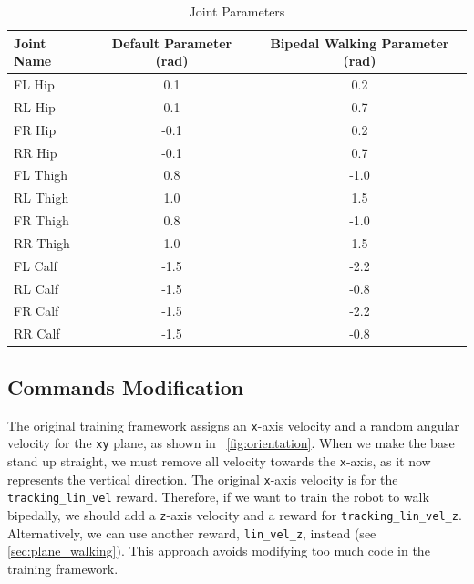 \documentclass{article} %
\begin{document}
\begin{table}[h]
   \centering
   \begin{tabular}{@{}lcc@{}}
   \toprule
   Joint Name       & Default Parameter (rad) & Bipedal Walking Parameter (rad) \\ \midrule
   \midrule
   FL Hip    & 0.1           &  0.2     \\
   RL Hip    & 0.1           &  0.7     \\
   FR Hip    & -0.1          &  0.2     \\
   RR Hip    & -0.1          &  0.7     \\
   FL Thigh  & 0.8           &  -1.0    \\
   RL Thigh  & 1.0           &  1.5     \\
   FR Thigh  & 0.8           &  -1.0    \\
   RR Thigh  & 1.0           &  1.5     \\
   FL Calf   & -1.5          &  -2.2    \\
   RL Calf   & -1.5          &  -0.8    \\
   FR Calf   & -1.5          &  -2.2    \\
   RR Calf   & -1.5          &  -0.8    \\
   \bottomrule
\end{tabular}
\vspace{-0.5em}
\caption{Joint Parameters}
\label{tab:joint_parameters}
\end{table}

\subsection{Commands Modification}

The original training framework assigns an \texttt{x}-axis velocity and a random angular velocity for the \texttt{xy} plane, as shown in ~\autoref{fig:orientation}. When we make the base stand up straight, we must remove all velocity towards the \texttt{x}-axis, as it now represents the vertical direction. The original \texttt{x}-axis velocity is for the \texttt{tracking\_lin\_vel} reward. Therefore, if we want to train the robot to walk bipedally, we should add a \texttt{z}-axis velocity and a reward for \texttt{tracking\_lin\_vel\_z}. Alternatively, we can use another reward, \texttt{lin\_vel\_z}, instead (see \autoref{sec:plane_walking}). This approach avoids modifying too much code in the training framework.
\end{document}
